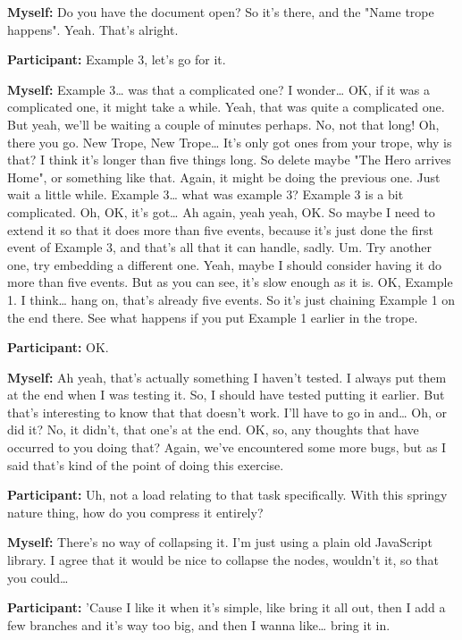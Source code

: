 \documentclass[11pt]{report}
\begin{document}
\begin{linenumbers}
\textbf{Myself:} Do you have the document open? So it's there, and the "Name trope happens". Yeah. That's alright.

\textbf{Participant:} Example 3, let's go for it.

\textbf{Myself:} Example 3\ldots{} was that a complicated one? I wonder\ldots{} OK, if it was a complicated one, it might take a while. Yeah, that was quite a complicated one. But yeah, we'll be waiting a couple of minutes perhaps. No, not that long! Oh, there you go. New Trope, New Trope\ldots{} It's only got ones from your trope, why is that? I think it's longer than five things long. So delete maybe "The Hero arrives Home", or something like that. Again, it might be doing the previous one. Just wait a little while. Example 3\ldots{} what was example 3? Example 3 is a bit complicated. Oh, OK, it's got\ldots{} Ah again, yeah yeah, OK. So maybe I need to extend it so that it does more than five events, because it's just done the first event of Example 3, and that's all that it can handle, sadly. Um. Try another one, try embedding a different one. Yeah, maybe I should consider having it do more than five events. But as you can see, it's slow enough as it is. OK, Example 1. I think\ldots{} hang on, that's already five events. So it's just chaining Example 1 on the end there. See what happens if you put Example 1 earlier in the trope.

\textbf{Participant:} OK.

\textbf{Myself:} Ah yeah, that's actually something I haven't tested. I always
put them at the end when I was testing it. So, I should have tested putting it
earlier. But that's interesting to know that that doesn't work. I'll have to go
in and\ldots{} Oh, or did it? No, it didn't, that one's at the end. OK, so, any
thoughts that have occurred to you doing that? Again, we've encountered some
more bugs, but as I said that's kind of the point of doing this
exercise.

\textbf{Participant:} Uh, not a load relating to that task specifically. With this springy nature thing, how do you compress it entirely?

\textbf{Myself:} There's no way of collapsing it. I'm just using a plain old JavaScript library. I agree that it would be nice to collapse the nodes, wouldn't it, so that you could\ldots{}

\textbf{Participant:} 'Cause I like it when it's simple, like bring it all out, then I add a few branches and it's way too big, and then I wanna like\ldots{} bring it in.


\end{linenumbers}
\end{document}
